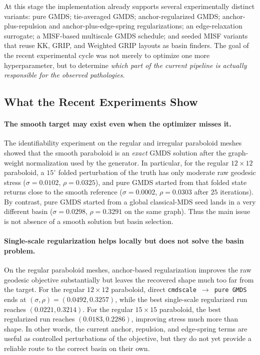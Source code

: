 \documentclass[twoside,11pt]{article}
\begin{document}
At this stage the implementation already supports several experimentally
distinct variants: pure GMDS; tie-averaged GMDS; anchor-regularized GMDS;
anchor-plus-repulsion and anchor-plus-edge-spring regularizations; an
edge-relaxation surrogate; a MISF-based multiscale GMDS schedule; and seeded
MISF variants that reuse KK, GRIP, and Weighted GRIP layouts as basin
finders.  The goal of the recent experimental cycle was not merely to optimize
one more hyperparameter, but to determine \emph{which part of the current
pipeline is actually responsible for the observed pathologies}.

\subsection{What the Recent Experiments Show}
\label{sec:recent_experiments}

\paragraph{The smooth target may exist even when the optimizer misses it.}
The identifiability experiment on the regular and irregular paraboloid meshes
showed that the smooth paraboloid is an \emph{exact} GMDS solution after the
graph-weight normalization used by the generator.  In particular, for the
regular $12\times 12$ paraboloid, a $15^\circ$ folded perturbation of the
truth has only moderate raw geodesic stress
($\sigma = 0.0102$, $\rho = 0.0325$), and pure GMDS started from that folded
state returns close to the smooth reference
($\sigma = 0.0002$, $\rho = 0.0303$ after $25$ iterations).  By contrast,
pure GMDS started from a global classical-MDS seed lands in a very different
basin ($\sigma = 0.0298$, $\rho = 0.3291$ on the same graph).  Thus the main
issue is not absence of a smooth solution but basin selection.

\paragraph{Single-scale regularization helps locally but does not solve the
basin problem.}
On the regular paraboloid meshes, anchor-based regularization improves the raw
geodesic objective substantially but leaves the recovered shape much too far
from the target.  For the regular $12\times 12$ paraboloid, direct
\texttt{cmdscale $\rightarrow$ pure GMDS} ends at
$(\sigma,\rho)=(0.0492, 0.3257)$, while the best single-scale regularized run
reaches $(0.0221, 0.3214)$.  For the regular $15\times 15$ paraboloid, the
best regularized run reaches $(0.0183, 0.2286)$, improving stress much more
than shape.  In other words, the current anchor, repulsion, and edge-spring
terms are useful as controlled perturbations of the objective, but they do not
yet provide a reliable route to the correct basin on their own.
\end{document}
